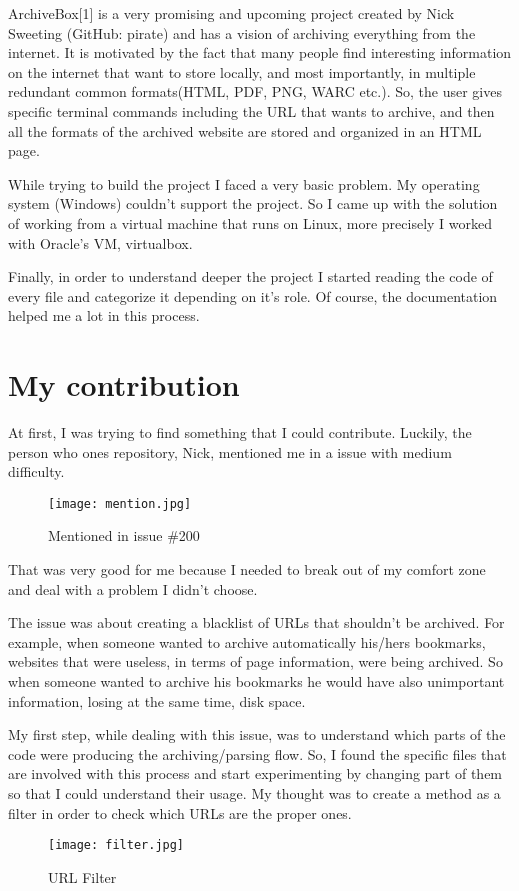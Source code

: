 \documentclass{article}
\begin{document}
ArchiveBox[1] is a very promising and upcoming project created by Nick Sweeting (GitHub: pirate) and has a vision of archiving everything from the internet. It is motivated by the fact that many people find interesting information on the internet that want to store locally, and most importantly, in multiple redundant common formats(HTML, PDF, PNG, WARC etc.). So, the user gives specific terminal commands including the URL that wants to archive, and then all the formats of the archived website are stored and organized in an HTML page.

While trying to build the project I faced a very basic problem. My operating system (Windows) couldn't support the project. So I came up with the solution of working from a virtual machine that runs on Linux, more precisely I worked with Oracle's VM, virtualbox. 

Finally, in order to understand deeper the project I started reading the code of every file and categorize it depending on it's role. Of course, the documentation helped me a lot in this process.


\section{My contribution}

At first, I was trying to find something that I could contribute. Luckily, the person who ones repository, Nick, mentioned me in a issue with medium difficulty.
\begin{figure}[tph!]
\centerline{\texttt{[image: mention.jpg]}}
    \caption{Mentioned in issue \#200}
    \label{fig:verticalcell}
\end{figure}
That was very good for me because I needed to break out of my comfort zone and deal with a problem I didn't choose.

The issue was about creating a blacklist of URLs that shouldn't be archived. For example, when someone wanted to archive automatically his/hers bookmarks, websites that were useless, in terms of page information, were being archived. So when someone wanted to archive his bookmarks he would have also unimportant information, losing at the same time, disk space.

My first step, while dealing with this issue, was to understand which parts of the code were producing the archiving/parsing flow. So, I found the specific files that are involved with this process and start experimenting by changing part of them so that I could understand their usage. My thought was to create a method as a filter in order to check which URLs are the proper ones. 
\begin{figure}[tph!]
\centerline{\texttt{[image: filter.jpg]}}
    \caption{URL Filter}
    \label{fig:verticalcell}
\end{figure}
\end{document}
